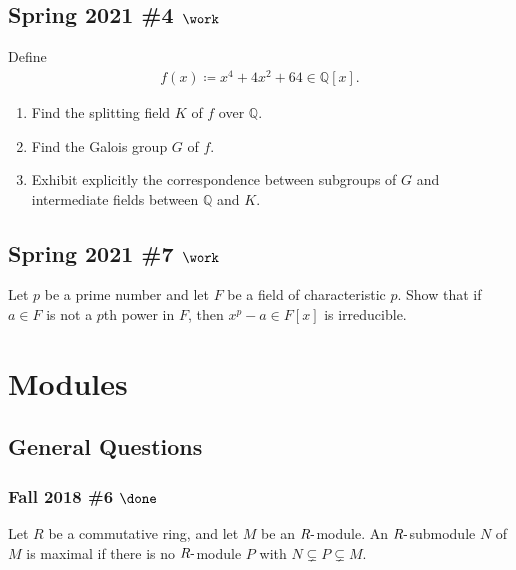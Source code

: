 \hypertarget{spring-2021-4-work}{%
\subsection{\texorpdfstring{Spring 2021 \#4
\(\work\)}{Spring 2021 \#4 \textbackslash work}}\label{spring-2021-4-work}}

Define
\begin{align*}
f(x) \coloneqq x^4 + 4x^2 + 64 \in {\mathbb{Q}}[x]
.\end{align*}

\begin{enumerate}
\def\labelenumi{\alph{enumi}.}
\item
  Find the splitting field \(K\) of \(f\) over \({\mathbb{Q}}\).
\item
  Find the Galois group \(G\) of \(f\).
\item
  Exhibit explicitly the correspondence between subgroups of \(G\) and
  intermediate fields between \({\mathbb{Q}}\) and \(K\).
\end{enumerate}

\hypertarget{spring-2021-7-work}{%
\subsection{\texorpdfstring{Spring 2021 \#7
\(\work\)}{Spring 2021 \#7 \textbackslash work}}\label{spring-2021-7-work}}

Let \(p\) be a prime number and let \(F\) be a field of characteristic
\(p\). Show that if \(a\in F\) is not a \(p\)th power in \(F\), then
\(x^p-a \in F[x]\) is irreducible.

\hypertarget{modules}{%
\section{Modules}\label{modules}}

\hypertarget{general-questions}{%
\subsection{General Questions}\label{general-questions}}

\hypertarget{fall-2018-6-done}{%
\subsubsection{\texorpdfstring{Fall 2018 \#6
\(\done\)}{Fall 2018 \#6 \textbackslash done}}\label{fall-2018-6-done}}

Let \(R\) be a commutative ring, and let \(M\) be an
\(R{\hbox{-}}\)module. An \(R{\hbox{-}}\)submodule \(N\) of \(M\) is
maximal if there is no \(R{\hbox{-}}\)module \(P\) with
\(N \subsetneq P \subsetneq M\).

